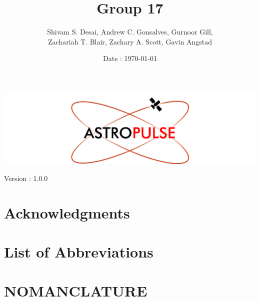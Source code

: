 \documentclass[en, screen, 12pt]{article}
\title{Group 17 \\ \doctitle}
\author{
Shivam S. Desai, 
Andrew C. Gonsalves, 
Gurnoor Gill, \\
Zachariah T. Blair,
Zachary A. Scott,
Gavin Angstad
}
\date{Date : \mydate\today}
\makeatletter
\newcommand{\VersionNumber}{Version : 1.0.0} %
\renewcommand{\maketitle}{
  \begin{titlepage}
    \null\vfill
    \centering
    \includegraphics[width=1.0\textwidth]{images/ASTROPULSE LOGO.png}
    \par\vspace{2em}
    {\Huge\bfseries\@title\par}
    \vspace{1.5em}
    {\Large\@author}
    \par\vspace{2em}
    {\Large\@date}
    \par\vspace{2em}
    {\Large\VersionNumber}
    \vfill





    
    \null
  \end{titlepage}
}
\makeatother
\begin{document}
\maketitle

% 

\newpage
\tableofcontents
\newpage

\section*{Acknowledgments}


\newpage
\section*{List of Abbreviations}


\newpage
\section*{NOMANCLATURE}

















\end{document}

